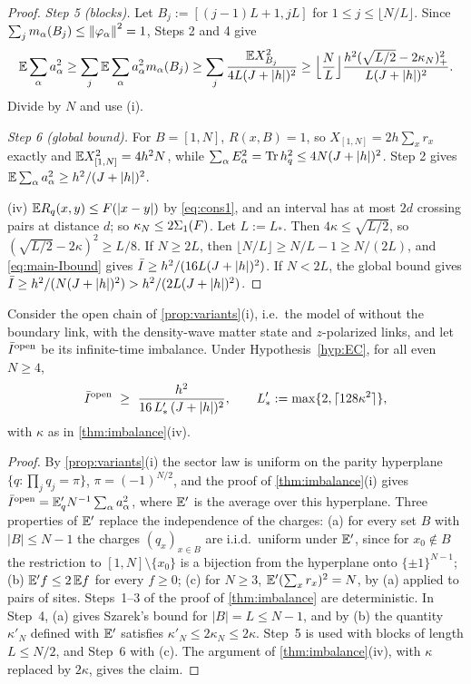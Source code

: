 \begin{proof}
\emph{Step 5 (blocks).}  Let $B_j:=[(j-1)L+1,jL]$ for $1\le j\le\lfloor N/L\rfloor$.  Since
$\sum_jm_\alpha(B_j)\le\left\|\varphi_\alpha\right\|^2=1$, Steps 2 and 4 give
\[
  \mathbb{E}\sum_\alpha a_\alpha^2\ge\sum_j\mathbb{E}\sum_\alpha a_\alpha^2m_\alpha(B_j)\ge\sum_j\frac{\mathbb{E} X_{B_j}^2}{4L(J+|h|)^2}
  \ge\Bigl\lfloor\frac NL\Bigr\rfloor\frac{h^2(\sqrt{L/2}-2\kappa_N)_+^2}{L(J+|h|)^2}.
\]
Divide by $N$ and use (i).

\emph{Step 6 (global bound).}  For $B=[1,N]$, $R(x,B)=1$, so $X_{[1,N]}=2h\sum_xr_x$ exactly and
$\mathbb{E} X_{[1,N]}^2=4h^2N$, while $\sum_\alpha E_\alpha^2=\operatorname{Tr}h_{q}^2\le4N(J+|h|)^2$.  Step 2 gives
$\mathbb{E}\sum_\alpha a_\alpha^2\ge h^2/(J+|h|)^2$.

(iv) $\mathbb{E} R_q(x,y)\le F(|x-y|)$ by \eqref{eq:cons1}, and an interval has at most $2d$ crossing pairs at distance
$d$; so $\kappa_N\le2\Sigma_1(F)$.  Let $L:=L_*$.  Then $4\kappa\le\sqrt{L/2}$, so
$(\sqrt{L/2}-2\kappa)^2\ge L/8$.  If $N\ge2L$, then $\lfloor N/L\rfloor\ge N/L-1\ge N/(2L)$, and
\eqref{eq:main-Ibound} gives $\bar I\ge h^2/(16L(J+|h|)^2)$.  If $N<2L$, the global bound gives
$\bar I\ge h^2/(N(J+|h|)^2)>h^2/(2L(J+|h|)^2)$.
\end{proof}

\begin{corollary}\label{cor:imbalanceopen}
Consider the open chain of \cref{prop:variants}(i), i.e.\ the model of \cite{SKKM2017} without the boundary link,
with the density-wave matter state and $z$-polarized links, and let $\bar I^{\rm open}$ be its infinite-time
imbalance.  Under Hypothesis~\ref{hyp:EC}, for all even $N\ge4$,
\[
  \Ibar^{\rm open}\ \ge\ \frac{h^2}{16\,L'_*\,(J+|h|)^2},\qquad L'_*:=\max\{2,\lceil128\kappa^2\rceil\},
\]
with $\kappa$ as in \cref{thm:imbalance}(iv).
\end{corollary}

\begin{proof}
By \cref{prop:variants}(i) the sector law is uniform on the parity hyperplane $\{q:\prod_jq_j=\pi\}$,
$\pi=(-1)^{N/2}$, and the proof of \cref{thm:imbalance}(i) gives $\bar I^{\rm open}=\mathbb{E}'_qN^{-1}\sum_\alpha a_\alpha^2$,
where $\mathbb{E}'$ is the average over this hyperplane.  Three properties of $\mathbb{E}'$ replace the independence of the
charges:
(a) for every set $B$ with $|B|\le N-1$ the charges $(q_x)_{x\in B}$ are i.i.d.\ uniform under $\mathbb{E}'$, since for
$x_0\notin B$ the restriction to $[1,N]\setminus\{x_0\}$ is a bijection from the hyperplane onto $\{\pm1\}^{N-1}$;
(b) $\mathbb{E}'f\le2\,\mathbb{E} f$ for every $f\ge0$;
(c) for $N\ge3$, $\mathbb{E}'(\sum_xr_x)^2=N$, by (a) applied to pairs of sites.
Steps~1--3 of the proof of \cref{thm:imbalance} are deterministic.  In Step~4, (a) gives Szarek's bound for
$|B|=L\le N-1$, and by (b) the quantity $\kappa'_N$ defined with $\mathbb{E}'$ satisfies $\kappa'_N\le2\kappa_N\le2\kappa$.
Step~5 is used with blocks of length $L\le N/2$, and Step~6 with (c).  The argument of
\cref{thm:imbalance}(iv), with $\kappa$ replaced by $2\kappa$, gives the claim.
\end{proof}

